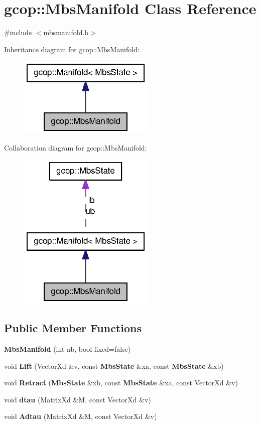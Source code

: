 \section{gcop\-:\-:\-Mbs\-Manifold \-Class \-Reference}
\label{classgcop_1_1MbsManifold}


{\ttfamily \#include $<$mbsmanifold.\-h$>$}



\-Inheritance diagram for gcop\-:\-:\-Mbs\-Manifold\-:
\nopagebreak
\begin{figure}[H]
\begin{center}
\leavevmode
\includegraphics[width=184pt]{classgcop_1_1MbsManifold__inherit__graph}
\end{center}
\end{figure}


\-Collaboration diagram for gcop\-:\-:\-Mbs\-Manifold\-:
\nopagebreak
\begin{figure}[H]
\begin{center}
\leavevmode
\includegraphics[width=184pt]{classgcop_1_1MbsManifold__coll__graph}
\end{center}
\end{figure}
\subsection*{\-Public \-Member \-Functions}
\begin{DoxyCompactItemize}
\item 
{\bf \-Mbs\-Manifold} (int nb, bool fixed=false)
\item 
void {\bf \-Lift} (\-Vector\-Xd \&v, const {\bf \-Mbs\-State} \&xa, const {\bf \-Mbs\-State} \&xb)
\item 
void {\bf \-Retract} ({\bf \-Mbs\-State} \&xb, const {\bf \-Mbs\-State} \&xa, const \-Vector\-Xd \&v)
\item 
void {\bf dtau} (\-Matrix\-Xd \&\-M, const \-Vector\-Xd \&v)
\item 
void {\bf \-Adtau} (\-Matrix\-Xd \&\-M, const \-Vector\-Xd \&v)
\end{DoxyCompactItemize}

